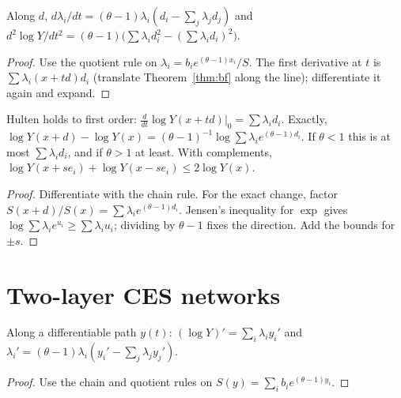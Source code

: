 \begin{theorem}
\label{thm:bf_second}
\leanok
{}
Along $d$, $d\lambda_i/dt = (\theta-1)\lambda_i(d_i - \sum_j\lambda_jd_j)$ and
$d^2\log Y/dt^2 = (\theta-1)\bigl(\sum\lambda_id_i^2 - (\sum\lambda_id_i)^2\bigr)$.
\end{theorem}
\begin{proof}
\leanok
Use the quotient rule on $\lambda_i = b_ie^{(\theta-1)x_i}/S$. The first derivative at $t$ is $\sum\lambda_i(x+td)d_i$
(translate Theorem~\ref{thm:bf} along the line); differentiate it again and expand.
\end{proof}

\begin{theorem}
\label{thm:bf}
\leanok
{}
Hulten holds to first order: $\frac{d}{dt}\log Y(x+td)|_0 = \sum\lambda_id_i$. Exactly,
$\log Y(x+d) - \log Y(x) = (\theta-1)^{-1}\log\sum\lambda_ie^{(\theta-1)d_i}$. If $\theta<1$ this is at most
$\sum\lambda_id_i$, and if $\theta>1$ at least. With complements, $\log Y(x+se_i) + \log Y(x-se_i) \le 2\log Y(x)$.
\end{theorem}
\begin{proof}
\leanok
Differentiate with the chain rule. For the exact change, factor $S(x+d)/S(x) = \sum\lambda_ie^{(\theta-1)d_i}$.
Jensen's inequality for $\exp$ gives $\log\sum\lambda_ie^{u_i} \ge \sum\lambda_iu_i$; dividing by $\theta-1$ fixes the
direction. Add the bounds for $\pm s$.
\end{proof}

\section{Two-layer CES networks}

\begin{lemma}
\label{lem:bf_path}
\leanok
{}
Along a differentiable path $y(t)$: $(\log Y)' = \sum_i\lambda_iy_i'$ and
$\lambda_i' = (\theta-1)\lambda_i(y_i' - \sum_j\lambda_jy_j')$.
\end{lemma}
\begin{proof}
\leanok
Use the chain and quotient rules on $S(y) = \sum_ib_ie^{(\theta-1)y_i}$.
\end{proof}

